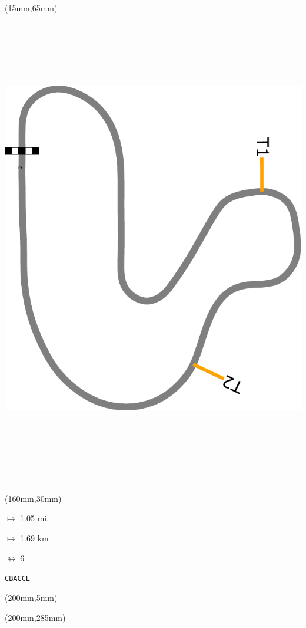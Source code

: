 \begin{textblock*}{185mm}(15mm,65mm)%
\centering
\mbox{\includegraphics[width=185mm,height=210mm,keepaspectratio]{PT/CBACCL.pdf}}
\end{textblock*}
\begin{textblock*}{40mm}(160mm,30mm)%
\Large
\par$\mapsto$ 1.05 mi.
\par$\mapsto$ 1.69 km
\par$\looparrowright$ 6
\par\hfill\tiny\tt CBACCL\\
\end{textblock*}
\begin{textblock*}{20mm}(200mm,5mm)%
\fbox{\thepage}
\label{CBACCL}
\end{textblock*}
\begin{textblock*}{20mm}(200mm,285mm)%
\fbox{\thepage}
\end{textblock*}

